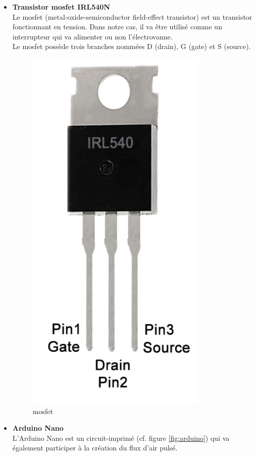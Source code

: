\begin{itemize}
    \item \textbf{Transistor \gls{mosfet} IRL540N}\\
          Le \gls{mosfet} (metal-oxide-semiconductor field-effect transistor) est un transistor fonctionnant en tension. Dans notre cas, il va
          être utilisé comme un interrupteur qui va alimenter ou non l'électrovanne. \\
          Le \gls{mosfet} possède trois branches nommées D (drain), G (gate) et S (source). 
          \begin{figure}[H]
              \centering
              \includegraphics[scale = 0.3]{assets/figures/mosfet_visuel.png}
              \caption{\gls{mosfet}}
              \label{fig:mosfet}
          \end{figure}
          \newpage
    \item \textbf{Arduino Nano}\\
          L'Arduino Nano est un circuit-imprimé (cf. figure \ref{fig:arduino}) qui va également participer à la création du flux d'air pulsé.

\end{itemize}
